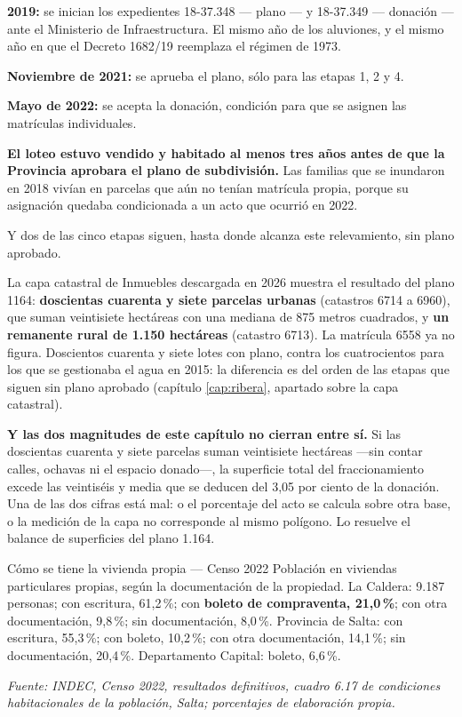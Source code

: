 \textbf{2019:} se inician los expedientes 18-37.348 --- plano --- y 18-37.349 --- donación --- ante el Ministerio de Infraestructura. El mismo año de los aluviones, y el mismo año en que el Decreto 1682/19 reemplaza el régimen de 1973.

\textbf{Noviembre de 2021:} se aprueba el plano, sólo para las etapas 1, 2 y 4.

\textbf{Mayo de 2022:} se acepta la donación, condición para que se asignen las matrículas individuales.

\textbf{El loteo estuvo vendido y habitado al menos tres años antes de que la Provincia aprobara el plano de subdivisión.} Las familias que se inundaron en 2018 vivían en parcelas que aún no tenían matrícula propia, porque su asignación quedaba condicionada a un acto que ocurrió en 2022.

Y dos de las cinco etapas siguen, hasta donde alcanza este relevamiento, sin plano aprobado.

La capa catastral de Inmuebles descargada en 2026 muestra el resultado del plano 1164: \textbf{doscientas cuarenta y siete parcelas urbanas} (catastros 6714 a 6960), que suman veintisiete hectáreas con una mediana de 875 metros cuadrados, y \textbf{un remanente rural de 1.150 hectáreas} (catastro 6713). La matrícula 6558 ya no figura. Doscientos cuarenta y siete lotes con plano, contra los cuatrocientos para los que se gestionaba el agua en 2015: la diferencia es del orden de las etapas que siguen sin plano aprobado (capítulo \ref{cap:ribera}, apartado sobre la capa catastral).

\textbf{Y las dos magnitudes de este capítulo no cierran entre sí.} Si las doscientas cuarenta y siete parcelas suman veintisiete hectáreas ---sin contar calles, ochavas ni el espacio donado---, la superficie total del fraccionamiento excede las veintiséis y media que se deducen del 3,05 por ciento de la donación. Una de las dos cifras está mal: o el porcentaje del acto se calcula sobre otra base, o la medición de la capa no corresponde al mismo polígono. Lo resuelve el balance de superficies del plano 1.164. 

\begin{ficha}{Cómo se tiene la vivienda propia --- Censo 2022}
Población en viviendas particulares propias, según la documentación de la propiedad. La Caldera: 9.187 personas; con escritura, 61,2\,\%; con \textbf{boleto de compraventa, 21,0\,\%}; con otra documentación, 9,8\,\%; sin documentación, 8,0\,\%. Provincia de Salta: con escritura, 55,3\,\%; con boleto, 10,2\,\%; con otra documentación, 14,1\,\%; sin documentación, 20,4\,\%. Departamento Capital: boleto, 6,6\,\%.

\textit{Fuente: INDEC, Censo 2022, resultados definitivos, cuadro 6.17 de condiciones habitacionales de la población, Salta; porcentajes de elaboración propia.}
\end{ficha}

